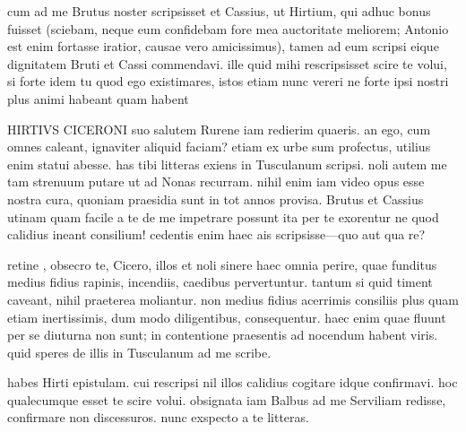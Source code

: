 


 cum ad me Brutus noster scripsisset et Cassius, ut Hirtium, qui adhuc bonus fuisset (sciebam, neque eum confidebam fore mea auctoritate meliorem; Antonio est enim fortasse iratior, causae vero amicissimus), tamen ad eum scripsi eique dignitatem Bruti et Cassi commendavi. ille quid mihi rescripsisset scire te volui, si forte idem tu quod ego existimares, istos etiam nunc vereri ne forte ipsi nostri plus animi habeant quam habent

 HIRTIVS CICERONI suo salutem Rurene iam redierim quaeris. an ego, cum omnes caleant, ignaviter aliquid faciam? etiam ex urbe sum profectus, utilius enim statui abesse. has tibi litteras exiens in Tusculanum scripsi. noli autem me tam strenuum putare ut ad Nonas recurram. nihil enim iam video opus esse nostra cura, quoniam praesidia sunt in tot annos provisa. Brutus et Cassius utinam quam facile a te de me impetrare possunt ita per te exorentur ne quod calidius ineant consilium! cedentis enim haec ais scripsisse—quo aut qua re?

 retine , obsecro te, Cicero, illos et noli sinere haec omnia perire, quae funditus medius fidius rapinis, incendiis, caedibus pervertuntur. tantum si quid timent caveant, nihil praeterea moliantur. non medius fidius acerrimis consiliis plus quam etiam inertissimis, dum modo diligentibus, consequentur. haec enim quae fluunt per se diuturna non sunt; in contentione praesentis ad nocendum habent viris. quid speres de illis in Tusculanum ad me scribe.

 habes Hirti epistulam. cui rescripsi nil illos calidius cogitare idque confirmavi. hoc qualecumque esset te scire volui. obsignata iam Balbus ad me Serviliam redisse, confirmare non discessuros. nunc exspecto a te litteras.
